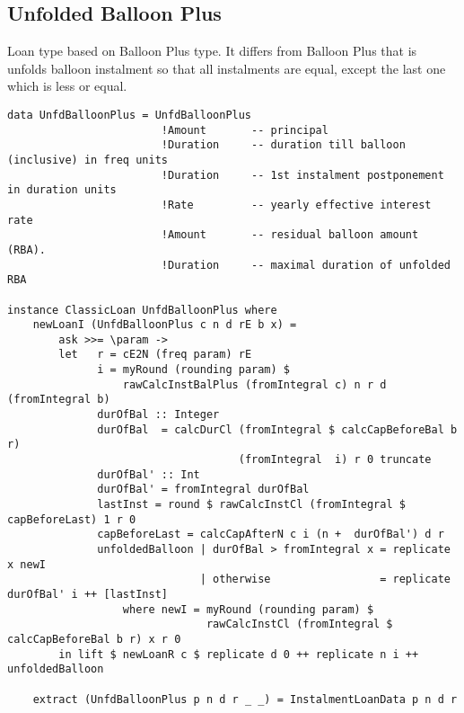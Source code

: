 \documentclass[letterpaper,11pt]{article}
\begin{document}
\subsection{Unfolded Balloon Plus}
Loan type based on Balloon Plus type. It differs from Balloon Plus that is unfolds balloon instalment so
that all instalments are equal, except the last one which is less or equal.

{\small
\begin{verbatim}
data UnfdBalloonPlus = UnfdBalloonPlus
                        !Amount       -- principal
                        !Duration     -- duration till balloon (inclusive) in freq units
                        !Duration     -- 1st instalment postponement in duration units
                        !Rate         -- yearly effective interest rate
                        !Amount       -- residual balloon amount (RBA).
                        !Duration     -- maximal duration of unfolded RBA

instance ClassicLoan UnfdBalloonPlus where
    newLoanI (UnfdBalloonPlus c n d rE b x) =
        ask >>= \param ->
        let   r = cE2N (freq param) rE
              i = myRound (rounding param) $
                  rawCalcInstBalPlus (fromIntegral c) n r d (fromIntegral b)
              durOfBal :: Integer
              durOfBal  = calcDurCl (fromIntegral $ calcCapBeforeBal b r)
                                    (fromIntegral  i) r 0 truncate
              durOfBal' :: Int
              durOfBal' = fromIntegral durOfBal
              lastInst = round $ rawCalcInstCl (fromIntegral $ capBeforeLast) 1 r 0
              capBeforeLast = calcCapAfterN c i (n +  durOfBal') d r
              unfoldedBalloon | durOfBal > fromIntegral x = replicate x newI
                              | otherwise                 = replicate durOfBal' i ++ [lastInst]
                  where newI = myRound (rounding param) $
                               rawCalcInstCl (fromIntegral $ calcCapBeforeBal b r) x r 0
        in lift $ newLoanR c $ replicate d 0 ++ replicate n i ++ unfoldedBalloon

    extract (UnfdBalloonPlus p n d r _ _) = InstalmentLoanData p n d r
\end{verbatim}
}
\end{document}
